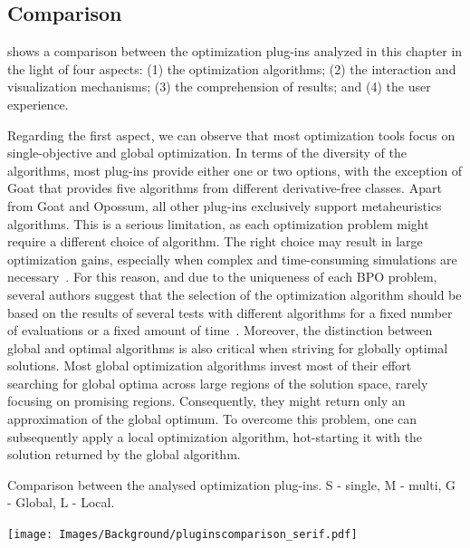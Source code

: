 	
	\subsection{Comparison}
	
	 shows a comparison between the optimization plug-ins analyzed in this chapter in the light of four aspects: (1) the optimization algorithms; (2) the interaction and visualization mechanisms; (3) the comprehension of results; and (4) the user experience.
		
	Regarding the first aspect, we can observe that most optimization tools focus on single-objective and global optimization. In terms of the diversity of the algorithms, most plug-ins provide either one or two options, with the exception of Goat that provides five algorithms from different derivative-free classes. Apart from Goat and Opossum, all other plug-ins exclusively support metaheuristics algorithms. %
	This is a serious limitation, as each optimization problem might require a different choice of algorithm. The right choice may result in large optimization gains, especially when complex and time-consuming simulations are necessary~\cite{Wortmann2016BBO}. For this reason, and due to the uniqueness of each \ac{BPO} problem, several authors suggest that the selection of the optimization algorithm should be based on the results of several tests with different algorithms for a fixed number of evaluations or a fixed amount of time~\cite{Hamdy2016,Wortmann2016BBO}. Moreover, the distinction between global and optimal algorithms is also critical when striving for globally optimal solutions. Most global optimization algorithms invest most of their effort searching for global optima across large regions of the solution space, rarely focusing on promising regions. Consequently, they might return only an approximation of the global optimum. To overcome this problem, one can subsequently apply a local optimization algorithm, hot-starting it with the solution returned by the global algorithm.
	
	\begin{table}[h]	
		\centering
		\caption[Comparison between the analysed optimization plug-ins]{Comparison between the analysed optimization plug-ins. S - single, M - multi, G - Global, L - Local.}
		
		\texttt{[image: Images/Background/pluginscomparison\_serif.pdf]}
		\label{table:pluginscompare}	
	\end{table}
	
